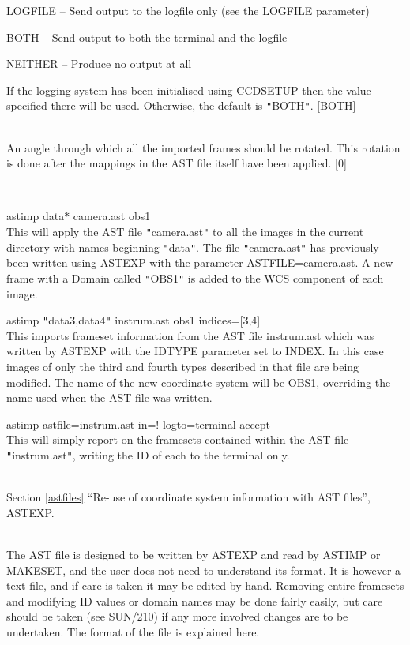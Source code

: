 \documentclass[twoside,11pt]{article}
\newcommand{\htmlref}[2]{#1}
\newcommand{\latexhtml}[2]{#1}
\newcommand{\xref}[3]{#1}
\renewcommand{\_}{\texttt{\symbol{95}}}
\newcommand{\qt}[1]{{\tt "}#1{\tt "}}
\newcommand{\routine}[1]{{\sc #1}}
\newcommand{\xroutine}[1]{\htmlref{{\sc #1}}{#1}}
\newcommand{\secref}[2]{\latexhtml{Section \ref{#1} ``#2''}{``\htmlref{#2}{#1}''}}
\newcommand{\sstexamples}[1]{
   \item[Examples:] \mbox{} \\
   \vspace{-3.5ex}
   \begin{description}
      #1
   \end{description}
}
\newcommand{\sstsubsection}[1]{ \item[{#1}] \mbox{} \\}
\newcommand{\sstexamplesubsection}[2]{\sloppy \item{\ssttt #1} \mbox{} \\ #2 }
\newcommand{\sstdiytopic}[2]{\item[#1:] \mbox{} \\[1.3ex] #2}
\newcommand{\sstitem}{\item}
\newcommand{\sstexamples}[1]{
      \item[Examples:] \\
      \begin{description}
         #1
      \end{description}
      \\
   }
\newcommand{\sstsubsection}[1]{\item[{#1}]}
\newcommand{\sstexamplesubsection}[2]{\item[{\ssttt #1}] #2}
\newcommand{\sstdiytopic}[2]{\item[{#1:}] #2 }
\newcommand{\sstitem}{\item}
\begin{document}
{{{{            \sstitem
               LOGFILE   -- Send output to the logfile only (see the
                               LOGFILE parameter)

            \sstitem
               BOTH      -- Send output to both the terminal and the
                               logfile

            \sstitem
               NEITHER   -- Produce no output at all

         }
         If the logging system has been initialised using \xroutine{CCDSETUP}
         then the value specified there will be used. Otherwise, the
         default is \qt{BOTH}.
         [BOTH]
      }
      \sstsubsection{
         ROT = \_DOUBLE (Read)
      } {
         An angle through which all the imported frames should be
         rotated.  This rotation is done after the mappings in the AST
         file itself have been applied.
         [0]
      }
   }
   \sstexamples{
      \sstexamplesubsection{
         astimp data$*$ camera.ast obs1
      } {
         This will apply the AST file \qt{camera.ast} to all the images in
         the current directory with names beginning \qt{data}.  The file
         \qt{camera.ast} has previously been written using \xroutine{ASTEXP} 
         with the parameter ASTFILE=camera.ast.  A new frame with a Domain
         called \qt{OBS1} is added to the WCS component of each image.
      }
      \sstexamplesubsection{
         astimp \qt{data3,data4} instrum.ast obs1 indices=[3,4]
      } {
         This imports frameset information from the AST file
         instrum.ast which was written by ASTEXP with the IDTYPE
         parameter set to INDEX.  In this case images of only the third
         and fourth types described in that file are being modified.
         The name of the new coordinate system will be OBS1,
         overriding the name used when the AST file was written.
      }
      \sstexamplesubsection{
         astimp astfile=instrum.ast in=! logto=terminal accept
      } {
         This will simply report on the framesets contained within
         the AST file \qt{instrum.ast}, writing the ID of each to the
         terminal only.
      }
   }
   \sstdiytopic{
      See also
   } {
      \secref{astfiles}{Re-use of coordinate system information with AST files},
      \xroutine{ASTEXP}.
   }
   \sstdiytopic{
      AST file format
   } {
         The AST file is designed to be written by \xroutine{ASTEXP} and read by
         \routine{ASTIMP} or \xroutine{MAKESET}, and the user does not need to understand its format.
         It is however a text file, and if care is taken it may be
         edited by hand.  Removing entire framesets and modifying ID
         values or domain names may be done fairly easily, but care
         should be taken (see \xref{SUN/210}{sun210}{}) if any more involved changes
         are to be undertaken.  The format of the file is explained
         here.

}}
\end{document}
